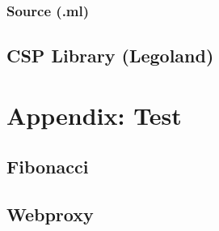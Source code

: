 \documentclass[a4paper,12pt]{article}
\begin{document}
\subsubsection{Source (.ml)}

\subsection{CSP Library (Legoland)}

\normalsize

\newpage
\section{Appendix: Test}
\scriptsize
\subsection{Fibonacci}


\subsection{Webproxy}

\normalsize
\end{document}
